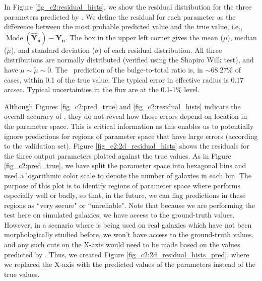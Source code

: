 In Figure \ref{fig_c2:residual_hists}, we show the residual distribution for the three parameters predicted by \gampen{}. We define the residual for each parameter as the difference between the most probable predicted value and the true value, i.e., $\operatorname{Mode}(\boldsymbol{\hat{Y}_n}) - \boldsymbol{Y_n}$. The box in the upper left corner gives 
the mean ($\mu$), median ($\tilde{\mu}$), and standard deviation ($\sigma$) of each residual distribution. 
All three distributions are normally distributed (verified using the Shapiro Wilk test), and have $\mu \sim \tilde{\mu} \sim 0$.
The \gampen\ prediction of the bulge-to-total ratio is, in $\sim68.27\%$ of cases, within 0.1 of the true value.
The typical error in effective radius is $0.17$ arcsec.
Typical uncertainties in the flux are at the 0.1-1\% level.

Although Figures \ref{fig_c2:pred_true} and \ref{fig_c2:residual_hists} indicate the overall accuracy of \gampen{}, they do not reveal how those errors depend on location in the parameter space. This is critical information as this enables us to potentially ignore predictions for regions of parameter space that have large errors (according to the validation set).
Figure \ref{fig_c2:2d_residual_hists} shows the residuals for the three output parameters plotted against the true values. As in Figure \ref{fig_c2:pred_true}, we have split the parameter space into hexagonal bins and used a logarithmic color scale to denote the number of galaxies in each bin. The purpose of this plot is to identify regions of parameter space where \gampen{} performs especially well or badly, so that, in the future, we can flag predictions in these regions as ``very secure" or ``unreliable". Note that because we are performing the test here on simulated galaxies, we have access to the ground-truth values. However, in a scenario where \gampen{} is being used on real galaxies which have not been morphologically studied before, we won't have access to the ground-truth values, and any such cuts on the X-axis would need to be made based on the values predicted by \gampen{}. Thus, we created Figure \ref{fig_c2:2d_residual_hists_pred}, where we replaced the X-axis with the predicted values of the parameters instead of the true values. 

